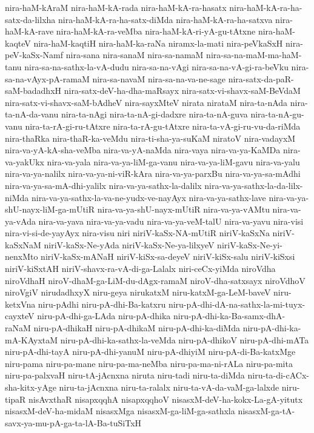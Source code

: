 {nira-haM-kAraM
nira-haM-kA-rada
nira-haM-kA-ra-hasatx
nira-haM-kA-ra-ha-satx-da-lilxha
nira-haM-kA-ra-ha-satx-diMda
nira-haM-kA-ra-ha-satxva
nira-haM-kA-rave
nira-haM-kA-ra-veMba
nira-haM-kA-ri-yA-gu-tAtxne
nira-haM-kaqteV
nira-haM-kaqtiH
nira-haM-ka-raNa
niramx-la-mati
nira-peVkaSxH
nira-peV-kaSx-Namf
nira-sana
nira-sanaM
nira-sa-namaM
nira-sa-na-maM-ma-haM-tanu
nira-sa-na-sathx-la-vA-dudu
nira-sa-na-vAgi
nira-sa-na-vA-gi-ra-beVku
nira-sa-na-vAyx-pA-ramaM
nira-sa-navaM
nira-sa-na-va-ne-sage
nira-satx-da-paR-saM-badadhxH
nira-satx-deV-ha-dha-maRsayx
nira-satx-vi-shavx-saM-BeVdaM
nira-satx-vi-shavx-saM-bAdheV
nira-sayxMteV
nirata
nirataM
nira-ta-nAda
nira-ta-nA-da-vanu
nira-ta-nAgi
nira-ta-nA-gi-dadxre
nira-ta-nA-guva
nira-ta-nA-gu-vanu
nira-ta-rA-gi-ru-tAtxre
nira-ta-rA-gu-tAtxre
nira-ta-vA-gi-ru-vu-da-riMda
nira-thaRka
nira-thaR-ka-veMdu
nira-ti-sha-ya-suKaM
niratoV
nira-vadayxM
nira-va-yA-kA-sha-veMba
nira-va-yA-naMda
nira-vaya
nira-va-ya-KaMDa
nira-va-yakUkx
nira-va-yala
nira-va-ya-liM-ga-vanu
nira-va-ya-liM-gavu
nira-va-yalu
nira-va-ya-nalilx
nira-va-ya-ni-viR-kAra
nira-va-ya-parxBu
nira-va-ya-sa-mAdhi
nira-va-ya-sa-mA-dhi-yalilx
nira-va-ya-sathx-la-dalilx
nira-va-ya-sathx-la-da-lilx-niMda
nira-va-ya-sathx-la-va-ne-yudx-ve-nayAyx
nira-va-ya-sathx-lave
nira-va-ya-shU-nayx-liM-ga-mUtiR
nira-va-ya-shU-nayx-mUtiR
nira-va-ya-vAMtu
nira-va-ya-vAda
nira-va-yava
nira-va-ya-vadu
nira-va-ya-veM-talU
nira-va-yavu
nira-visi
nira-vi-si-de-yayAyx
nira-visu
niri
niriV-kaSx-NA-mUtiR
niriV-kaSxNa
niriV-kaSxNaM
niriV-kaSx-Ne-yAda
niriV-kaSx-Ne-ya-lilxyeV
niriV-kaSx-Ne-yi-nenxMto
niriV-kaSx-mANaH
niriV-kiSx-sa-deyeV
niriV-kiSx-salu
niriV-kiSxsi
niriV-kiSxtAH
niriV-shavx-ra-vA-di-ga-Lalalx
niri-ceCx-yiMda
niroVdha
niroVdhaH
niroV-dhaM-ga-LiM-du-dAgx-ramaM
niroV-dha-satxsayx
niroVdhoV
niroVgiV
nirudadhxyX
niru-geya
nirukatxM
niru-katxM-ga-LeM-baveV
niru-ketxVna
niru-pAdhi
niru-pA-dhi-Ba-katxru
niru-pA-dhi-dA-na-sathx-la-mi-tuyx-cayxteV
niru-pA-dhi-ga-LAda
niru-pA-dhika
niru-pA-dhi-ka-Ba-samx-dhA-raNaM
niru-pA-dhikaH
niru-pA-dhikaM
niru-pA-dhi-ka-diMda
niru-pA-dhi-ka-mA-KAyxtaM
niru-pA-dhi-ka-sathx-la-veMda
niru-pA-dhikoV
niru-pA-dhi-mATa
niru-pA-dhi-tayA
niru-pA-dhi-yanuM
niru-pA-dhiyiM
niru-pA-di-Ba-katxMge
niru-pama
niru-pa-mane
niru-pa-ma-neMba
niru-pa-ma-ni-rALa
niru-pa-mita
niru-pa-palxvaH
niru-tA-jAcnxna
niruta
niru-tadi
niru-ta-diMda
niru-ta-di-cACx-sha-kitx-yAge
niru-ta-jAcnxna
niru-ta-ralalx
niru-ta-vA-da-vaM-ga-lalxde
niru-tipaR
nisAvxthaR
nisapxqqhA
nisapxqqhoV
nisasxM-deV-ha-kokx-La-gA-yitutx
nisasxM-deV-ha-midaM
nisasxMga
nisasxM-ga-liM-ga-sathxla
nisasxM-ga-tA-savx-ya-mu-pA-ga-ta-lA-Ba-tuSiTxH
}
